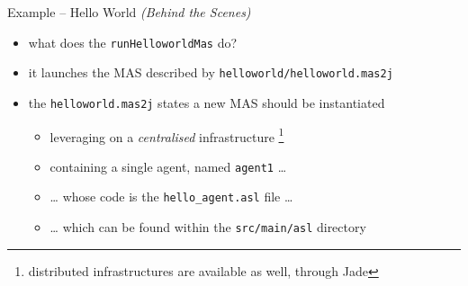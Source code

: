 \documentclass[presentation]{beamer}\mode<presentation>{\usetheme{AMSBolognaFC}}
\begin{document}
\begin{frame}[c]{Example \theJasonExample{} -- Hello World \textit{(Behind the Scenes)}}
    
    
    \begin{itemize}
        \item what does the \texttt{runHelloworldMas} do?
        
        \vfill
        
        \item it launches the MAS described by \texttt{helloworld/\alert{helloworld.mas2j}}
        
        
        \vfill
        
        \item the \texttt{helloworld.mas2j} states a new MAS should be instantiated 
        \begin{itemize}
            \item leveraging on a \emph{centralised} infrastructure%
            \footnote{distributed infrastructures are available as well, through Jade}
            
            \item containing a single agent, named \alert{\texttt{agent1}} \ldots{}
            
            \item \ldots{} whose code is the \texttt{\alert{hello\_agent}.asl} file \ldots{}
            
            \item \ldots{} which can be found within the \texttt{src/main/asl} directory
        \end{itemize}
    \end{itemize}
\end{frame} 
\end{document}
